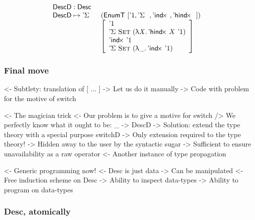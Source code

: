 \[\stk{
\DescD : \Desc \\
\begin{array}{@{}ll}
\DescD \mapsto \DSigma{}{} & (\EnumT [ \DUnit, \DSigma{}{}, \DIndx{}, \DHindx{}{} ]) \\
                           & \left[\begin{array}{l}
                                   \DUnit                                \\
                                   \DSigma{\Set}{(\LAM{\V{X}} \DHindx{X}{\DUnit})} \\
                                   \DIndx{\DUnit}                                  \\
                                   \DSigma{\Set}{(\LAM{\_} \DIndx{\DUnit})}
                                   \end{array}
                             \right]
\end{array}
}
\]


\subsubsection{Final move}

\begin{structure}
<- Subtlety: translation of [ ... ]
    -> Let us do it manually
        -> Code with problem for the motive of switch
\end{structure}

\begin{structure}
<- The magician trick
    <- Our problem is to give a motive for switch
        /> We perfectly know what it ought to be: \_ -> DescD
    -> Solution: extend the type theory with a special purpose switchD
        -> Only extension required to the type theory!
        -> Hidden away to the user by the syntactic sugar
            -> Sufficient to ensure unavailability as a raw operator
            <- Another instance of type propagation
\end{structure}

\begin{structure}
<- Generic programming now!
    <- Desc is just data
        -> Can be manipulated
    <- Free induction scheme on Desc
        -> Ability to inspect data-types
        -> Ability to program on data-types
\end{structure}

\subsubsection{Desc, atomically}

